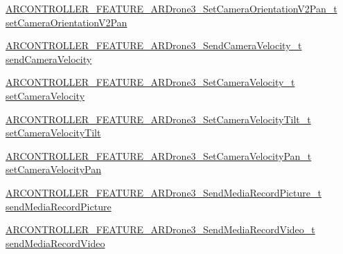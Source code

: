 \begin{DoxyCompactItemize}
\item 
\hyperlink{_a_r_c_o_n_t_r_o_l_l_e_r___feature_8h_aa552d9e3336031825b9b0a1f1f135ef7}{A\+R\+C\+O\+N\+T\+R\+O\+L\+L\+E\+R\+\_\+\+F\+E\+A\+T\+U\+R\+E\+\_\+\+A\+R\+Drone3\+\_\+\+Set\+Camera\+Orientation\+V2\+Pan\+\_\+t} \hyperlink{struct_a_r_c_o_n_t_r_o_l_l_e_r___f_e_a_t_u_r_e___a_r_drone3__t_a521cdb71ba9012172032a9316bd9617a}{set\+Camera\+Orientation\+V2\+Pan}
\item 
\hyperlink{_a_r_c_o_n_t_r_o_l_l_e_r___feature_8h_a7d039d7a72b88998f06f4b3697219958}{A\+R\+C\+O\+N\+T\+R\+O\+L\+L\+E\+R\+\_\+\+F\+E\+A\+T\+U\+R\+E\+\_\+\+A\+R\+Drone3\+\_\+\+Send\+Camera\+Velocity\+\_\+t} \hyperlink{struct_a_r_c_o_n_t_r_o_l_l_e_r___f_e_a_t_u_r_e___a_r_drone3__t_a3da2caa54edbb59163b9b222f98217a6}{send\+Camera\+Velocity}
\item 
\hyperlink{_a_r_c_o_n_t_r_o_l_l_e_r___feature_8h_a0b7b128a8fd2e6adeba25efa4cb2ab02}{A\+R\+C\+O\+N\+T\+R\+O\+L\+L\+E\+R\+\_\+\+F\+E\+A\+T\+U\+R\+E\+\_\+\+A\+R\+Drone3\+\_\+\+Set\+Camera\+Velocity\+\_\+t} \hyperlink{struct_a_r_c_o_n_t_r_o_l_l_e_r___f_e_a_t_u_r_e___a_r_drone3__t_a2ab6cf649699010e79d7ff1433647191}{set\+Camera\+Velocity}
\item 
\hyperlink{_a_r_c_o_n_t_r_o_l_l_e_r___feature_8h_aa5a0284f2c22db2875c58fceea471d1a}{A\+R\+C\+O\+N\+T\+R\+O\+L\+L\+E\+R\+\_\+\+F\+E\+A\+T\+U\+R\+E\+\_\+\+A\+R\+Drone3\+\_\+\+Set\+Camera\+Velocity\+Tilt\+\_\+t} \hyperlink{struct_a_r_c_o_n_t_r_o_l_l_e_r___f_e_a_t_u_r_e___a_r_drone3__t_ab74ef0fee3b008b6cf99092faeea746b}{set\+Camera\+Velocity\+Tilt}
\item 
\hyperlink{_a_r_c_o_n_t_r_o_l_l_e_r___feature_8h_a8659a0285c2261601a82531766a9e38a}{A\+R\+C\+O\+N\+T\+R\+O\+L\+L\+E\+R\+\_\+\+F\+E\+A\+T\+U\+R\+E\+\_\+\+A\+R\+Drone3\+\_\+\+Set\+Camera\+Velocity\+Pan\+\_\+t} \hyperlink{struct_a_r_c_o_n_t_r_o_l_l_e_r___f_e_a_t_u_r_e___a_r_drone3__t_ab4bb5aad954cf6aa110197499bfc232f}{set\+Camera\+Velocity\+Pan}
\item 
\hyperlink{_a_r_c_o_n_t_r_o_l_l_e_r___feature_8h_af051d2ce49a7268cc844b612fa2fee61}{A\+R\+C\+O\+N\+T\+R\+O\+L\+L\+E\+R\+\_\+\+F\+E\+A\+T\+U\+R\+E\+\_\+\+A\+R\+Drone3\+\_\+\+Send\+Media\+Record\+Picture\+\_\+t} \hyperlink{struct_a_r_c_o_n_t_r_o_l_l_e_r___f_e_a_t_u_r_e___a_r_drone3__t_aa7df01a59c908d24b4b56237f6f6ac31}{send\+Media\+Record\+Picture}
\item 
\hyperlink{_a_r_c_o_n_t_r_o_l_l_e_r___feature_8h_a518faf87fadf774924a4f9018fc8e81f}{A\+R\+C\+O\+N\+T\+R\+O\+L\+L\+E\+R\+\_\+\+F\+E\+A\+T\+U\+R\+E\+\_\+\+A\+R\+Drone3\+\_\+\+Send\+Media\+Record\+Video\+\_\+t} \hyperlink{struct_a_r_c_o_n_t_r_o_l_l_e_r___f_e_a_t_u_r_e___a_r_drone3__t_a6fc61305783e07ac1ce350018ee400ab}{send\+Media\+Record\+Video}

\end{DoxyCompactItemize}
